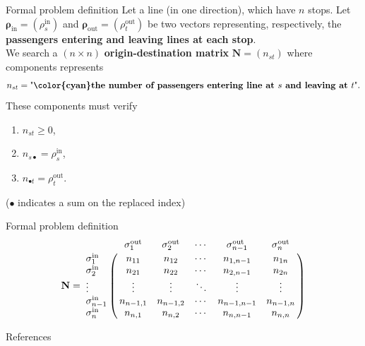 \documentclass[10pt]{beamer}
\newcommand{\imp}[1]{\textbf{\color{cyan}#1}}
\begin{document}
	
	\begin{frame}{Formal problem definition}
		Let a line (in one direction), which have $n$ stops. Let $\bm{\rho}_\text{in} = (\rho^\text{in}_s)$ and $\bm{\rho}_\text{out} = (\rho^\text{out}_t)$ be two vectors representing, respectively, the \imp{passengers entering and leaving lines at each stop}. \\
		\vspace{0.4cm}
		We search a $(n \times n)$ \imp{origin-destination matrix} $\mathbf{N} = (n_{st})$ where components represents
		$$
			n_{st} = \text{"\imp{the number of passengers entering line at $s$ and leaving at $t$}"}.
		$$
		These components must verify
		\begin{enumerate}
			\item $n_{st} \geq 0$,
			\item $n_{s\bullet} = \rho^\text{in}_s$,
			\item $n_{\bullet t} = \rho^\text{out}_t$.
		\end{enumerate}
		\small ($\bullet$ indicates a sum on the replaced index)
	\end{frame}
	
	
	\begin{frame}{Formal problem definition}
		$$
		 \mathbf{N} = \bordermatrix{
			   & \sigma^\text{out}_1 & \sigma^\text{out}_2  & \cdots & \sigma^\text{out}_{n-1} & \sigma^\text{out}_n   \cr
			\sigma^\text{in}_1 & n_{11} & n_{12} & \cdots & n_{1,n-1} & n_{1n} \cr
			\sigma^\text{in}_2 & n_{21} & n_{22} & \cdots & n_{2,n-1} & n_{2n} \cr
			\vdots & \vdots & \vdots & \ddots & \vdots & \vdots \cr
			\sigma^\text{in}_{n-1} & n_{n-1,1} & n_{n-1,2} & \cdots & n_{n-1,n-1} & n_{n-1,n} \cr
			\sigma^\text{in}_{n} & n_{n,1} & n_{n,2} & \cdots & n_{n,n-1} & n_{n,n}}
		$$
	\end{frame}
	
	
	\begin{frame}[allowframebreaks]{References}
		
		
		
		
	\end{frame}
	
\end{document}
